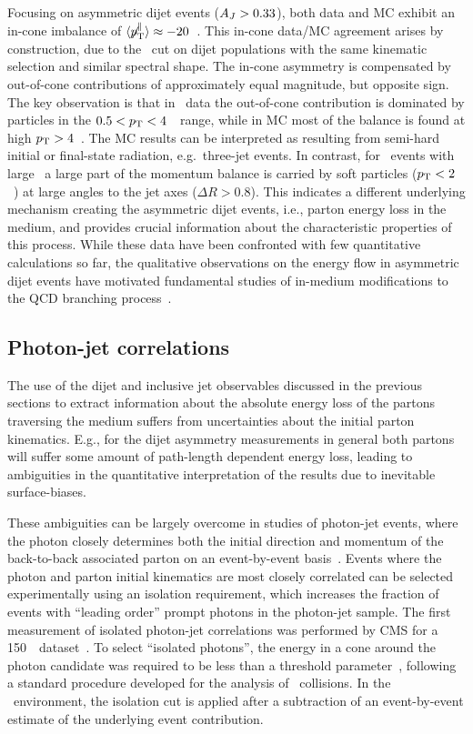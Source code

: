 Focusing on asymmetric dijet events ($A_J > 0.33$), both data and MC exhibit an
in-cone imbalance of $\langle \displaystyle{\not} p_{\mathrm{T}}^{\parallel} \rangle \approx
-20$~\GeVc. This in-cone data/MC agreement arises by construction, due to the \AJ\ cut on 
dijet populations with the same kinematic selection and similar spectral shape. The 
in-cone asymmetry is compensated by out-of-cone contributions of approximately equal magnitude,
but opposite sign. The key observation is that in  \PbPb\ data the out-of-cone contribution 
is dominated by particles in the $0.5 < \mbox{$p_{\mathrm{T}}$} < 4$~\GeVc\ range, 
while in MC most of the balance is found at high $\mbox{$p_{\mathrm{T}}$} > 4$~\GeVc. 
The MC results can be interpreted as resulting from semi-hard initial or final-state radiation, 
e.g.\ three-jet events.
In contrast, for \PbPb\ events with large \AJ\ a large part of the momentum balance is
carried by soft particles ($\mbox{$p_{\mathrm{T}}$} < 2$~\GeVc) at large angles to the jet axes ($\Delta R > 0.8$). 
This indicates a different underlying mechanism creating the asymmetric dijet events, i.e., 
parton energy loss in the medium, and provides crucial information about the characteristic
properties of this process. While these data have been confronted with few quantitative
calculations so far, the qualitative observations on the energy flow in asymmetric dijet 
events have motivated fundamental studies of in-medium modifications to the 
QCD branching process~\cite{Blaizot:2013vha,Blaizot:2013hx, Armesto:2013fca}.

\subsection{Photon-jet correlations}

The use of the dijet and inclusive jet observables discussed in the previous sections
to extract information about the absolute energy loss of the partons traversing the medium suffers from
uncertainties about the initial parton kinematics. E.g., for the dijet asymmetry
measurements in general both partons will suffer some amount of path-length dependent
energy loss, leading to ambiguities in the quantitative interpretation of the results
due to inevitable surface-biases.

These ambiguities can be largely overcome in studies of photon-jet events,
where the photon closely determines both the initial direction and momentum 
of the back-to-back associated parton on an event-by-event basis~\cite{Wang:1996yh}.
Events where the photon and parton initial kinematics are most closely correlated
can be selected experimentally using an isolation requirement, which
increases the fraction of events with ``leading order'' prompt photons in
the photon-jet sample. The first measurement of isolated photon-jet correlations
was performed by CMS for a 150\mubinv\ \PbPb\ dataset~\cite{Chatrchyan:2012gt}.
To select ``isolated photons'', the energy in a cone around 
the photon candidate was required to be less than a threshold parameter~\cite{HIPhoton},
following a standard procedure developed for the analysis of \pp\ collisions. In the \PbPb\ 
environment, the isolation cut is applied after a subtraction of an event-by-event 
estimate of the underlying event contribution.

